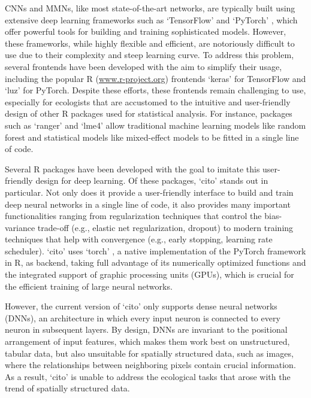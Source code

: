 \documentclass[12pt,twoside]{scrreport}
\newcommand{\pkg}[1]{`#1'}
\begin{document}
CNNs and MMNs, like most state-of-the-art networks, are typically built using extensive deep learning frameworks such as \pkg{TensorFlow} \citep{abadiTensorFlowSystemLargeScale2016} and \pkg{PyTorch} \citep{paszkePyTorchImperativeStyle2019}, which offer powerful tools for building and training sophisticated models. However, these frameworks, while highly flexible and efficient, are notoriously difficult to use due to their complexity and steep learning curve. To address this problem, several frontends have been developed with the aim to simplify their usage, including the popular R (\url{www.r-project.org}) frontends \pkg{keras} \citep{chollet2015keras} for TensorFlow and \pkg{luz} \citep{falbelLuzHigherLevel2024} for PyTorch. Despite these efforts, these frontends remain challenging to use, especially for ecologists that are accustomed to the intuitive and user-friendly design of other R packages used for statistical analysis. For instance, packages such as \pkg{ranger} and \pkg{lme4} allow traditional machine learning models like random forest and statistical models like mixed-effect models to be fitted in a single line of code.

Several R packages have been developed with the goal to imitate this user-friendly design for deep learning. Of these packages, \pkg{cito} \citep{amesoderCitoPackageTraining2024} stands out in particular. Not only does it provide a user-friendly interface to build and train deep neural networks in a single line of code, it also provides many important functionalities ranging from regularization techniques that control the bias-variance trade-off (e.g., elastic net regularization, dropout) to modern training techniques that help with convergence (e.g., early stopping, learning rate scheduler). \pkg{cito} uses \pkg{torch} \citep{falbelTorchTensorsNeural2024}, a native implementation of the PyTorch framework in R, as backend, taking full advantage of its numerically optimized functions and the integrated support of graphic processing units (GPUs), which is crucial for the efficient training of large neural networks.

However, the current version of \pkg{cito} only supports dense neural networks (DNNs), an architecture in which every input neuron is connected to every neuron in subsequent layers. By design, DNNs are invariant to the positional arrangement of input features, which makes them work best on unstructured, tabular data, but also unsuitable for spatially structured data, such as images, where the relationships between neighboring pixels contain crucial information. As a result, \pkg{cito} is unable to address the ecological tasks that arose with the trend of spatially structured data.
\end{document}
